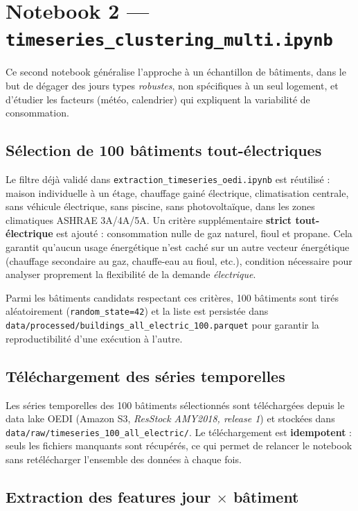 \documentclass[11pt,a4paper]{article}
\newcommand{\code}[1]{\texttt{#1}}
\begin{document}
\section{Notebook 2 --- \code{timeseries\_clustering\_multi.ipynb}}

Ce second notebook généralise l'approche à un échantillon de bâtiments, dans le but de dégager
des jours types \emph{robustes}, non spécifiques à un seul logement, et d'étudier les facteurs
(météo, calendrier) qui expliquent la variabilité de consommation.

\subsection{Sélection de 100 bâtiments tout-électriques}

Le filtre déjà validé dans \code{extraction\_timeseries\_oedi.ipynb} est réutilisé :
maison individuelle à un étage, chauffage gainé électrique, climatisation centrale, sans
véhicule électrique, sans piscine, sans photovoltaïque, dans les zones climatiques ASHRAE
3A/4A/5A. Un critère supplémentaire \textbf{strict tout-électrique} est ajouté : consommation
nulle de gaz naturel, fioul et propane. Cela garantit qu'aucun usage énergétique n'est
\og{}caché\fg{} sur un autre vecteur énergétique (chauffage secondaire au gaz, chauffe-eau au
fioul, etc.), condition nécessaire pour analyser proprement la flexibilité de la demande
\emph{électrique}.

Parmi les bâtiments candidats respectant ces critères, 100 bâtiments sont tirés aléatoirement
(\code{random\_state=42}) et la liste est persistée dans
\code{data/processed/buildings\_all\_electric\_100.parquet} pour garantir la reproductibilité
d'une exécution à l'autre.

\subsection{Téléchargement des séries temporelles}

Les séries temporelles des 100 bâtiments sélectionnés sont téléchargées depuis le data lake
OEDI (Amazon S3, \emph{ResStock AMY2018, release 1}) et stockées dans
\code{data/raw/timeseries\_100\_all\_electric/}. Le téléchargement est \textbf{idempotent} :
seuls les fichiers manquants sont récupérés, ce qui permet de relancer le notebook sans
retélécharger l'ensemble des données à chaque fois.

\subsection{Extraction des features jour \texorpdfstring{$\times$}{x} bâtiment}
\end{document}
